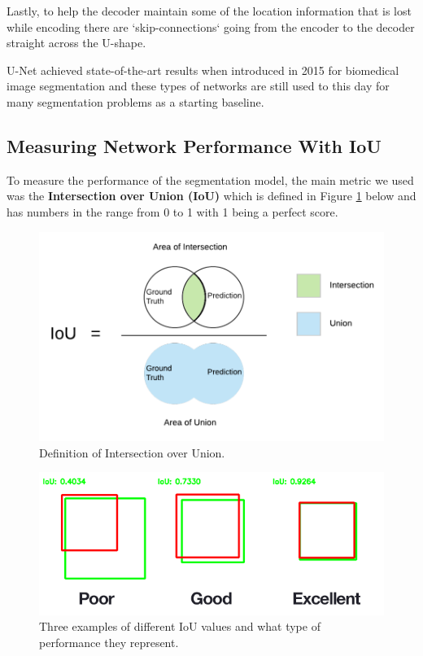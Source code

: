 Lastly, to help the decoder maintain some of the location information that is lost while encoding there are `skip-connections` going from the encoder to the decoder straight across the U-shape.

U-Net achieved state-of-the-art results when introduced in 2015 for biomedical image segmentation and these types of networks are still used to this day for many segmentation problems as a starting baseline.

\subsection{Measuring Network Performance With IoU}
To measure the performance of the segmentation model, the main metric we used was the \textbf{Intersection over Union (IoU)} which is defined in Figure \ref{fig:iou} below and has numbers in the range from 0 to 1 with 1 being a perfect score.

\begin{figure}[H] \centering
    \includegraphics[width=\linewidth]{figures/iou1.png}
    \caption{Definition of Intersection over Union.}
    \label{fig:iou}
\end{figure}

\begin{figure}[H] \centering
    \includegraphics[width=\linewidth]{figures/iou2.png}
    \caption{Three examples of different IoU values and what type of performance they represent.}
\end{figure}

